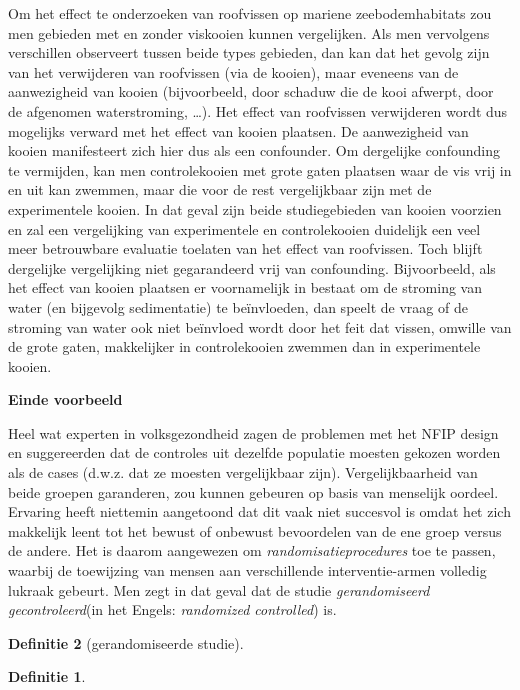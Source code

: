 \documentclass[
  12pt,dutch,coursenotes]{book}
\theoremstyle{definition}
\newtheorem{definition}{Definitie}[chapter]
\theoremstyle{definition}
\theoremstyle{definition}
\theoremstyle{remark}
\begin{document}
Om het effect te onderzoeken van roofvissen op mariene zeebodemhabitats zou men gebieden met en zonder viskooien kunnen vergelijken. Als men vervolgens verschillen observeert tussen beide types gebieden, dan kan dat het gevolg zijn van het verwijderen van roofvissen (via de kooien), maar eveneens van de aanwezigheid van kooien (bijvoorbeeld, door schaduw die de kooi afwerpt, door de afgenomen waterstroming, \ldots). Het effect van roofvissen verwijderen wordt dus mogelijks verward met het effect van kooien plaatsen. De aanwezigheid van kooien manifesteert zich hier dus als een confounder. Om dergelijke confounding te vermijden, kan men controlekooien met grote gaten plaatsen waar de vis vrij in en uit kan zwemmen, maar die voor de rest vergelijkbaar zijn met de experimentele kooien. In dat geval zijn beide studiegebieden van kooien voorzien en zal een vergelijking van experimentele en controlekooien duidelijk een veel meer betrouwbare evaluatie toelaten van het effect van roofvissen. Toch blijft dergelijke vergelijking niet gegarandeerd vrij van confounding. Bijvoorbeeld, als het effect van kooien plaatsen er voornamelijk in bestaat om de stroming van water (en bijgevolg sedimentatie) te beïnvloeden, dan speelt de vraag of de stroming van water ook niet beïnvloed wordt door het feit dat vissen, omwille van de grote gaten, makkelijker in controlekooien zwemmen dan in experimentele kooien.

\textbf{Einde voorbeeld}

Heel wat experten in volksgezondheid zagen de problemen met het NFIP design
en suggereerden dat de controles uit dezelfde populatie moesten gekozen
worden als de cases (d.w.z. dat ze moesten vergelijkbaar zijn).
Vergelijkbaarheid van beide groepen garanderen, zou kunnen gebeuren op basis
van menselijk oordeel. Ervaring heeft niettemin aangetoond dat dit vaak niet
succesvol is omdat het zich makkelijk leent tot het bewust of onbewust
bevoordelen van de ene groep versus de andere. Het is daarom aangewezen om
\emph{randomisatieprocedures} toe te passen, waarbij de toewijzing van
mensen aan verschillende interventie-armen volledig lukraak gebeurt. Men
zegt in dat geval dat de studie \emph{gerandomiseerd gecontroleerd}(in
het Engels: \emph{randomized controlled}) is.

\begin{definition}[gerandomiseerde studie]
\begin{definition}

\protect\hypertarget{def:unnamed-chunk-69}{}{\label{def:unnamed-chunk-69} \iffalse (gerandomiseerde studie) \fi{} }

\end{definition}
\end{definition}
\end{document}
